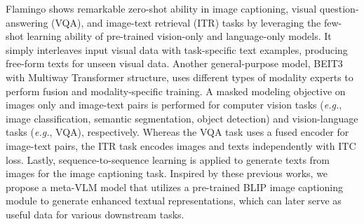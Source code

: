 Flamingo \cite{alayrac2022flamingo} shows remarkable zero-shot ability in image captioning, visual question-answering (VQA), and image-text retrieval (ITR) tasks by leveraging the few-shot learning ability of pre-trained vision-only and language-only models. It simply interleaves input visual data with task-specific text examples, producing free-form texts for unseen visual data. Another general-purpose model, BEIT3 \cite{wang2022image} with Multiway Transformer structure, uses different types of modality experts to perform fusion and modality-specific training. A masked modeling objective on images only and image-text pairs is performed for computer vision tasks (\textit{e.g.}, image classification, semantic segmentation, object detection) and vision-language tasks (\textit{e.g.}, VQA), respectively. Whereas the VQA task uses a fused encoder for image-text pairs, the ITR task encodes images and texts independently with ITC loss. Lastly, sequence-to-sequence learning is applied to generate texts from images for the image captioning task. Inspired by these previous works, we propose a meta-VLM model that utilizes a pre-trained BLIP \cite{li2022blip} image captioning module to generate enhanced textual representations, which can later serve as useful data for various downstream tasks.

